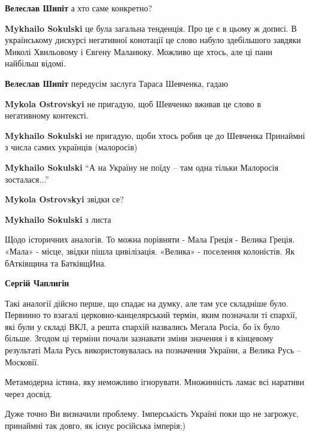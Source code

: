\begin{itemize}
\begin{itemize}
\textbf{Велеслав Шипіт} а хто саме конкретно?

\textbf{Mykhailo Sokulski} це була загальна тенденція. Про це є в цьому ж дописі.
В українському дискурсі негативної конотації це слово набуло здебільшого завдяки Миколі Хвильовому і Євгену Маланюку. Можливо ще хтось, але ці пани найбільш відомі.

\textbf{Велеслав Шипіт} передусім заслуга Тараса Шевченка, гадаю

\textbf{Mykola Ostrovskyi} не пригадую, щоб Шевченко вживав це слово в негативному контексті.

\textbf{Mykhailo Sokulski} не пригадую, щоби хтось робив це до Шевченка
Принаймні з числа самих українців (малоросів)

\textbf{Mykhailo Sokulski} “А на Україну не поїду – там одна тільки Малоросія зосталася...”

\textbf{Mykola Ostrovskyi} звідки се?

\textbf{Mykhailo Sokulski} з листа

\end{itemize} %


Щодо історичних аналогів. То можна порівняти - Мала Греція - Велика Греція.
«Мала» - місце, звідки пішла цивілізація. «Велика» - поселення колоністів. Як
бАтківщина та БатківщИна.

\begin{itemize} %
\textbf{Сергій Чаплигін} 

Такі аналогії дійсно перше, що спадає на думку, але там усе складніше було.
Первинно то взагалі церковно-канцелярський термін, яким позначали ті єпархії,
які були у складі ВКЛ, а решта єпархій назвались Мегала Росіа, бо їх було
більше. Згодом ці терміни почали зазнавати зміни значення і в кінцевому
результаті Мала Русь використовувалась на позначення України, а Велика Русь --
Московії.

\end{itemize} %

Метамодерна істина, яку неможливо ігнорувати. Множинність ламає всі наративи через досвід.


Дуже точно Ви визначили проблему. Імперськість Україні поки що не загрожує,
принаймні так довго, як існує російська імперія;)


\end{itemize}
